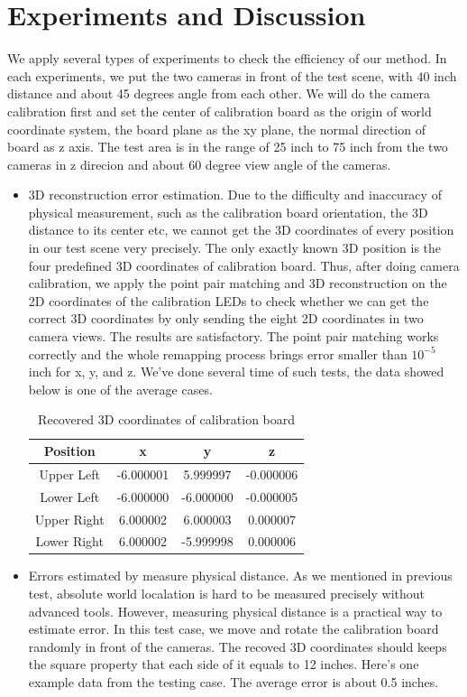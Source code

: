 \documentclass[10pt,twocolumn,letterpaper]{article}
\begin{document}
\section{Experiments and Discussion}
We apply several types of experiments to check the efficiency of our method. In each experiments, we put the two cameras in front of the test scene, with 40 inch distance and about 45 degrees angle from each other. We will do the camera calibration first and set the center of calibration board as the origin of world coordinate system, the board plane as the xy plane, the normal direction of board as z axis. The test area is in the range of 25 inch to 75 inch from the two cameras in z direcion and about 60 degree view angle of the cameras.
\begin{itemize}
\item 3D reconstruction error estimation. Due to the difficulty and inaccuracy of physical measurement, such as the calibration board orientation, the 3D distance to its center etc, we cannot get the 3D coordinates of every position in our test scene very precisely. The only exactly known 3D position is the four predefined 3D coordinates of calibration board. Thus, after doing camera calibration, we apply the point pair matching and 3D reconstruction on the 2D coordinates of the calibration LEDs to check whether we can get the correct 3D coordinates by only sending the eight 2D coordinates in two camera views. The results are satisfactory. The point pair matching works correctly and the whole remapping process brings error smaller than $10^{-5}$ inch for x, y, and z. We've done several time of such tests, the data showed below is one of the average cases.
\begin{table}[ht]
\caption{Recovered 3D coordinates of calibration board}
\centering
\begin{tabular}{c c c c}
\hline\hline
Position & x & y & z\\[0.5ex]
\hline
Upper Left & -6.000001	& 5.999997	& -0.000006 \\
Lower Left &-6.000000	& -6.000000	& -0.000005\\
Upper Right & 6.000002	& 6.000003	& 0.000007\\
Lower Right & 6.000002	& -5.999998	& 0.000006 \\[1ex]
\hline
\end{tabular}
\end{table}
\item Errors estimated by measure physical distance. As we mentioned in previous test, absolute world localation is hard to be measured precisely without advanced tools. However, measuring physical distance is a practical way to estimate error. In this test case, we move and rotate the calibration board randomly in front of the cameras. The recoved 3D coordinates should keeps the square property that each side of it equals to 12 inches. Here's one example data from the testing case. The average error is about 0.5 inches. 

\end{itemize}
\end{document}
